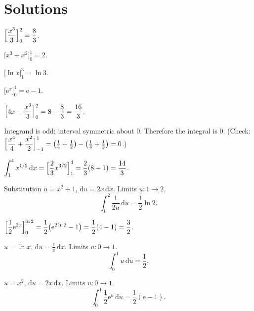 \section{Solutions}

\begin{solutions}
  \item $\displaystyle\Bigl[\frac{x^{3}}{3}\Bigr]_{0}^{2}=\frac{8}{3}$.

  \item $\displaystyle\bigl[x^{3}+x^{2}\bigr]_{0}^{1}=2$.

  \item $\displaystyle\bigl[\ln x\bigr]_{1}^{3}=\ln 3$.

  \item $\displaystyle\bigl[\mathrm{e}^{x}\bigr]_{0}^{1}=\mathrm{e}-1$.

  \item $\displaystyle\Bigl[4x-\frac{x^{3}}{3}\Bigr]_{0}^{2}
        =8-\frac{8}{3}=\frac{16}{3}$.

  \item Integrand is odd; interval symmetric about $0$. Therefore the
        integral is $0$. (Check:
        $\displaystyle\Bigl[\frac{x^{4}}{4}+\frac{x^{2}}{2}\Bigr]_{-1}^{1}
        =\bigl(\tfrac14+\tfrac12\bigr)-\bigl(\tfrac14+\tfrac12\bigr)=0$.)

  \item $\displaystyle\int_{1}^{4} x^{1/2}\,\mathrm{d}x
        =\Bigl[\frac{2}{3}x^{3/2}\Bigr]_{1}^{4}=\frac{2}{3}(8-1)=\frac{14}{3}$.

  \item Substitution $u=x^{2}+1$, $\mathrm{d}u=2x\,\mathrm{d}x$. Limits
        $u:1\to 2$.
        \[
          \int_{1}^{2} \frac{1}{2u}\,\mathrm{d}u=\frac{1}{2}\ln 2 .
        \]

  \item $\displaystyle\Bigl[\frac{1}{2}\mathrm{e}^{2x}\Bigr]_{0}^{\ln 2}
        =\frac{1}{2}\bigl(\mathrm{e}^{2\ln 2}-1\bigr)=\frac{1}{2}(4-1)=\frac{3}{2}$.

  \item $u=\ln x$, $\mathrm{d}u=\frac{1}{x}\,\mathrm{d}x$. Limits
        $u:0\to 1$.
        \[
          \int_{0}^{1} u\,\mathrm{d}u=\frac{1}{2} .
        \]

  \item $u=x^{2}$, $\mathrm{d}u=2x\,\mathrm{d}x$. Limits $u:0\to 1$.
        \[
          \int_{0}^{1} \frac{1}{2}\mathrm{e}^{u}\,\mathrm{d}u
            =\frac{1}{2}(\mathrm{e}-1) .
        \]


\end{solutions}
